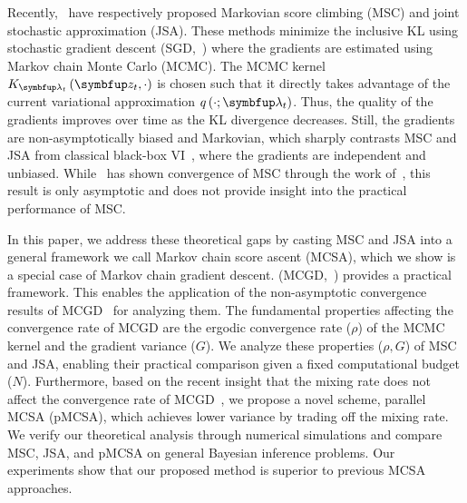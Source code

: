 Recently,~\citet{NEURIPS2020_b2070693,pmlr-v124-ou20a} have respectively proposed Markovian score climbing (MSC) and joint stochastic approximation (JSA).
These methods minimize the inclusive KL using stochastic gradient descent (SGD,~\citealt{robbins_stochastic_1951}) where the gradients are estimated using Markov chain Monte Carlo (MCMC).
The MCMC kernel \(K_{\vlambda_t}\left(\vz_t, \cdot\right)\) is chosen such that it directly takes advantage of the current variational approximation \(q\left(\cdot; \vlambda_t\right)\).
Thus, the quality of the gradients improves over time as the KL divergence decreases.
Still, the gradients are non-asymptotically biased and Markovian, which sharply contrasts MSC and JSA from classical black-box VI~\citep{pmlr-v33-ranganath14, JMLR:v18:16-107}, where the gradients are independent and unbiased.
While~\citet{NEURIPS2020_b2070693} has shown convergence of MSC through the work of~\citet{gu_stochastic_1998}, this result is only asymptotic and does not provide insight into the practical performance of MSC.

%

In this paper, we address these theoretical gaps by casting MSC and JSA into a general framework we call Markov chain score ascent (MCSA), which we show is a special case of Markov chain gradient descent.  (MCGD,~\citealt{duchi_ergodic_2012, NEURIPS2018_1371bcce, pmlr-v99-karimi19a, doan_convergence_2020}) provides a practical framework. This enables the application of the non-asymptotic convergence results of MCGD~\citep{duchi_ergodic_2012, NEURIPS2018_1371bcce, pmlr-v99-karimi19a, doan_finitetime_2020, doan_convergence_2020, Xiong_Xu_Liang_Zhang_2021, debavelaere_convergence_2021} for analyzing them.
The fundamental properties affecting the convergence rate of MCGD are the ergodic convergence rate (\(\rho\)) of the MCMC kernel and the gradient variance (\(G\)).
We analyze these properties (\(\rho, G\)) of MSC and JSA, enabling their practical comparison given a fixed computational budget (\(N\)).
Furthermore, based on the recent insight that the mixing rate does not affect the convergence rate of MCGD~\citet{doan_convergence_2020,doan_finitetime_2020}, we propose a novel scheme, parallel MCSA (pMCSA), which achieves lower variance by trading off the mixing rate.
We verify our theoretical analysis through numerical simulations and compare MSC, JSA, and pMCSA on general Bayesian inference problems.
Our experiments show that our proposed method is superior to previous MCSA approaches.

